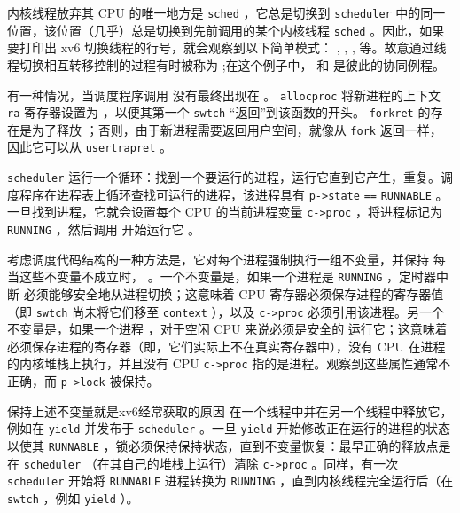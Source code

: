 内核线程放弃其 CPU 的唯一地方是
    \lstinline{sched}    ，它总是切换到    \lstinline{scheduler}    中的同一位置，该位置（几乎）总是切换到先前调用的某个内核线程
    \lstinline{sched}    。因此，如果要打印出 xv6 切换线程的行号，就会观察到以下简单模式：
        ,
        ,
        ,
        等。故意通过线程切换相互转移控制的过程有时被称为
       ;在这个例子中，
        和
        是彼此的协同例程。  

有一种情况，当调度程序调用
        没有最终出现在
        。
    \lstinline{allocproc}    将新进程的上下文    \lstinline{ra}    寄存器设置为
        ，以便其第一个    \lstinline{swtch}    “返回”到该函数的开头。
    \lstinline{forkret}    的存在是为了释放
        ；否则，由于新进程需要返回用户空间，就像从    \lstinline{fork}    返回一样，因此它可以从
    \lstinline{usertrapret}    。  

   \lstinline{scheduler}   
        运行一个循环：找到一个要运行的进程，运行它直到它产生，重复。调度程序在进程表上循环查找可运行的进程，该进程具有
    \lstinline{p->state}   
    \lstinline{==}   
    \lstinline{RUNNABLE}    。一旦找到进程，它就会设置每个 CPU 的当前进程变量
    \lstinline{c->proc}    ，将进程标记为
    \lstinline{RUNNING}    ，然后调用
        开始运行它
        。  

考虑调度代码结构的一种方法是，它对每个进程强制执行一组不变量，并保持
 每当这些不变量不成立时，      。一个不变量是，如果一个进程是
    \lstinline{RUNNING}    ，定时器中断
        必须能够安全地从进程切换；这意味着 CPU 寄存器必须保存进程的寄存器值（即
    \lstinline{swtch}    尚未将它们移至
    \lstinline{context}    ），以及
    \lstinline{c->proc}    必须引用该进程。另一个不变量是，如果一个进程
        ，对于空闲 CPU 来说必须是安全的
        运行它；这意味着
        必须保存进程的寄存器（即，它们实际上不在真实寄存器中），没有 CPU 在进程的内核堆栈上执行，并且没有 CPU
    \lstinline{c->proc}    指的是进程。观察到这些属性通常不正确，而
    \lstinline{p->lock}    被保持。  

保持上述不变量就是xv6经常获取的原因
        在一个线程中并在另一个线程中释放它，例如在
    \lstinline{yield}    并发布于
    \lstinline{scheduler}    。一旦    \lstinline{yield}    开始修改正在运行的进程的状态以使其
    \lstinline{RUNNABLE}    ，锁必须保持保持状态，直到不变量恢复：最早正确的释放点是在
    \lstinline{scheduler}   （在其自己的堆栈上运行）清除
    \lstinline{c->proc}    。同样，有一次
    \lstinline{scheduler}    开始将    \lstinline{RUNNABLE}    进程转换为
    \lstinline{RUNNING}    ，直到内核线程完全运行后（在
    \lstinline{swtch}    ，例如
    \lstinline{yield}    ）。
